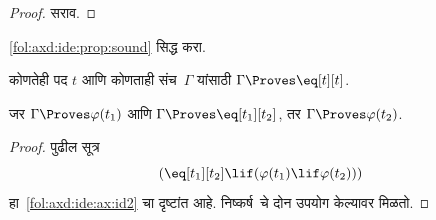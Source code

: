 \begin{proof}
  सराव.
\end{proof}

\begin{prob}
\ref{fol:axd:ide:prop:sound} सिद्ध करा.
\end{prob}

\begin{prop}\label{fol:axd:ide:prop:iden1}
 कोणतेही पद $t$ आणि कोणताही संच~$\Gamma$ यांसाठी
 $\Gamma \Proves \eq[t][t]$.
\end{prop}

\begin{prop}\label{fol:axd:ide:prop:iden2}
  जर $\Gamma \Proves \varphi(t_1)$ आणि $\Gamma \Proves
  \eq[t_1][t_2]$, तर $\Gamma \Proves \varphi(t_2)$.
\end{prop}

\begin{proof}
पुढील सूत्र
\[(\eq[t_1][t_2] \lif (\varphi(t_1) \lif \varphi(t_2)))
\]
हा~\ref{fol:axd:ide:ax:id2} चा दृष्टांत आहे. निष्कर्ष~\MP चे दोन उपयोग केल्यावर
मिळतो.
\end{proof}



